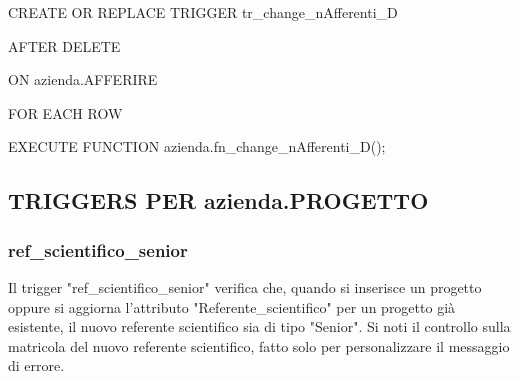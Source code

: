     \ttfamily
        \begin{flushleft}
            \begin{description}
                \item CREATE OR REPLACE TRIGGER tr\_change\_nAfferenti\_D
                \item AFTER DELETE
                \item ON azienda.AFFERIRE
                \item FOR EACH ROW
                \item EXECUTE FUNCTION azienda.fn\_change\_nAfferenti\_D();
            \end{description}
        \end{flushleft}
    \normalfont

\newpage

    \subsection{TRIGGERS PER azienda.PROGETTO}

    \subsubsection{ref\_scientifico\_senior}
    Il trigger "ref\_scientifico\_senior" verifica che, quando si inserisce un progetto oppure si aggiorna l'attributo "Referente\_scientifico"
    per un progetto già esistente, il nuovo referente scientifico sia di tipo "Senior".
    Si noti il controllo sulla matricola del nuovo referente scientifico, fatto solo per personalizzare il messaggio di errore.

